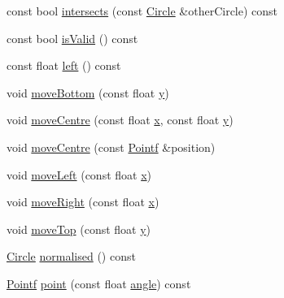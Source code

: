 \begin{DoxyCompactItemize}
\item 
const bool \hyperlink{classprism_1_1geometry_1_1_circle_ac1b7633b8c79512d73fa8a9615d85e9f}{intersects} (const \hyperlink{classprism_1_1geometry_1_1_circle}{Circle} \&other\+Circle) const 
\item 
const bool \hyperlink{classprism_1_1geometry_1_1_circle_ae03e53948818ee2a81e94180bf74cb75}{is\+Valid} () const 
\item 
const float \hyperlink{classprism_1_1geometry_1_1_circle_a10d1243c18b74798f1dd59793022ac83}{left} () const 
\item 
void \hyperlink{classprism_1_1geometry_1_1_circle_ad72079c73cfb8cf3426e23aa64c574e4}{move\+Bottom} (const float \hyperlink{classprism_1_1geometry_1_1_circle_aea5997071a76ee672b6b7ec0908ebe11}{y})
\item 
void \hyperlink{classprism_1_1geometry_1_1_circle_a95e440e954c78f8e9e407c816948daac}{move\+Centre} (const float \hyperlink{classprism_1_1geometry_1_1_circle_aeb38df0ed8d1b3b84c4eb42b50a05348}{x}, const float \hyperlink{classprism_1_1geometry_1_1_circle_aea5997071a76ee672b6b7ec0908ebe11}{y})
\item 
void \hyperlink{classprism_1_1geometry_1_1_circle_ae4bad4394ccb5705894365335733267c}{move\+Centre} (const \hyperlink{classprism_1_1geometry_1_1_pointf}{Pointf} \&position)
\item 
void \hyperlink{classprism_1_1geometry_1_1_circle_a1e885c1237cbc61bfaece2f31b756a67}{move\+Left} (const float \hyperlink{classprism_1_1geometry_1_1_circle_aeb38df0ed8d1b3b84c4eb42b50a05348}{x})
\item 
void \hyperlink{classprism_1_1geometry_1_1_circle_a8f51014f0b8c2dffcf0718fbd7d585f0}{move\+Right} (const float \hyperlink{classprism_1_1geometry_1_1_circle_aeb38df0ed8d1b3b84c4eb42b50a05348}{x})
\item 
void \hyperlink{classprism_1_1geometry_1_1_circle_ac95e8868af4ea96a7593d52a7357f2f9}{move\+Top} (const float \hyperlink{classprism_1_1geometry_1_1_circle_aea5997071a76ee672b6b7ec0908ebe11}{y})
\item 
\hyperlink{classprism_1_1geometry_1_1_circle}{Circle} \hyperlink{classprism_1_1geometry_1_1_circle_adebf8895998188cfc637b6541121950b}{normalised} () const 
\item 
\hyperlink{classprism_1_1geometry_1_1_pointf}{Pointf} \hyperlink{classprism_1_1geometry_1_1_circle_ac9f3831443459d81b0d0bc47bcfb0382}{point} (const float \hyperlink{classprism_1_1geometry_1_1_circle_a48b7121373194162c3268247213e4dc4}{angle}) const 
\item 

\end{DoxyCompactItemize}
